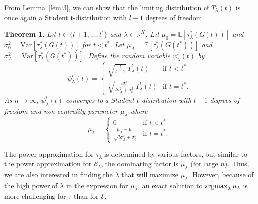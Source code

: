 \documentclass[10pt,draftclsnofoot,onecolumn]{IEEEtran}
\newtheorem{theorem}{Theorem}
\theoremstyle{definition}
\newcommand{\argmax}{\operatornamewithlimits{argmax}}
\begin{document}
From Lemma~\ref{lem:3}, we can show that the limiting distribution of
$T_{\lambda}^{l}(t)$ is once again a Student t-distribution with
$l-1$ degrees of freedom.
\begin{theorem}
  \label{thm:5}
  Let $t \in \{l+1, \dots, t^{*}\}$ and $\lambda \in
  \mathbb{R}^{K}$. Let $\mu_0 = \mathbb{E}[\tau_{\lambda}^{*}(G(t))]$
  and $\sigma_0^{2} = \mathrm{Var}[\tau_{\lambda}^{*}(G(t))]$ for $t <
  t^{*}$. Let $\mu_A = \mathbb{E}[\tau_{\lambda}^{*}(G(t^{*}))]$ and
  $\sigma_{A}^{2} = \mathrm{Var}[\tau_{\lambda}^{*}(G(t^{*}))]$. Define
  the random variable $\psi_{\lambda}^{l}(t)$ by
  \begin{equation}
    \label{eq:50}
    \psi_{\lambda}^{l}(t) = \begin{cases}
      \sqrt{\tfrac{l}{l+1}}\, T_{\lambda}^{l}(t) & \text{if $t <
        t^{*}$} \\
      \sqrt{\tfrac{l \sigma_0^{2}}{l \sigma_A^{2} + \sigma_0^{2}} }\,
      T_{\lambda}^{l}(t) & \text{if $t = t^{*}$}.
        \end{cases}
  \end{equation}
  As $n \rightarrow \infty$, $\psi_{\lambda}^{l}(t)$ converges to a Student $t$-distribution with $l - 1$ degrees of freedom and
  non-centrality parameter $\mu_{\lambda}$ where
  \begin{equation}
    \label{eq:51}
    \mu_{\lambda} = \begin{cases} 0 & \text{if $t < t^{*}$} \\
      \frac{\mu_A - \mu_0}{\sqrt{l \sigma_A^{2} + \sigma_0^{2}}} &
       \text{if $t = t^{*}$}.
      \end{cases}
  \end{equation}
\end{theorem}
The power approximation for $\tau_{\lambda}$ is determined by various
factors, but similar to the power approximation for
$\mathcal{E}_{\lambda}$, the dominating factor is $\mu_\lambda$ (for
large $n$). Thus, we are also interested in finding the $\lambda$
that will maximize $\mu_\lambda$. However, because of the high power
of $\lambda$ in the expression for $\mu_{\lambda}$, an exact 
solution to $\argmax_{\lambda}{\mu_{\lambda}}$ is more challenging for
$\tau$ than for $\mathcal{E}$. 
\end{document}

